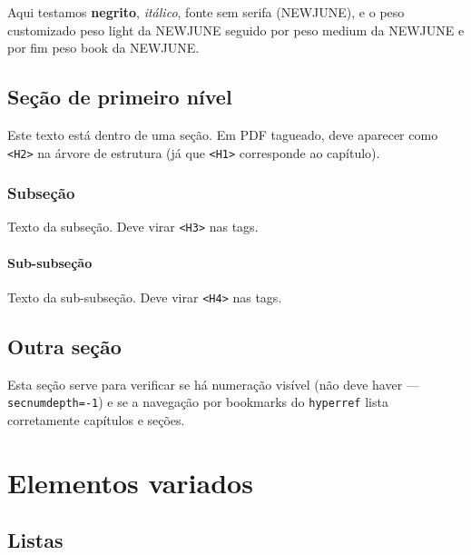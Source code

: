 \documentclass[11pt,a5paper,twoside,openright]{scrbook}
\begin{document}
Aqui testamos \textbf{negrito}, \emph{itálico},
\textsf{fonte sem serifa (NEWJUNE)}, e o peso customizado
{\Light peso light da NEWJUNE} seguido por
{\media peso medium da NEWJUNE} e por fim
{\fontebook peso book da NEWJUNE}.

\section{Seção de primeiro nível}

Este texto está dentro de uma seção. Em PDF tagueado, deve
aparecer como \texttt{<H2>} na árvore de estrutura (já que
\texttt{<H1>} corresponde ao capítulo).

\subsection{Subseção}

Texto da subseção. Deve virar \texttt{<H3>} nas tags.

\subsubsection{Sub-subseção}

Texto da sub-subseção. Deve virar \texttt{<H4>} nas tags.

\section{Outra seção}

Esta seção serve para verificar se há numeração visível (não
deve haver — \texttt{secnumdepth=-1}) e se a navegação por
bookmarks do \texttt{hyperref} lista corretamente capítulos
e seções.

\chapter{Elementos variados}

\section{Listas}
\end{document}
